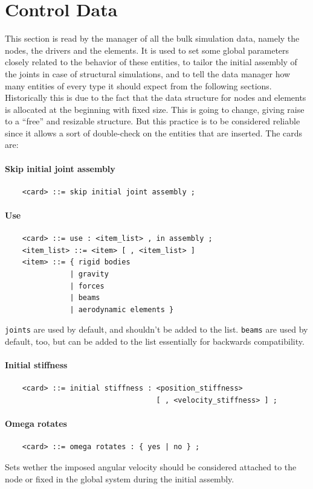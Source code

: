 \documentclass[10pt,dvips]{report}
\begin{document}
\chapter{Control Data}
This section is read by the manager of all the bulk simulation data, namely
the nodes, the drivers and the elements. It is used to set some global
parameters closely related to the behavior of these entities, to tailor the
initial assembly of the joints in case of structural simulations, and to
tell the data manager how many entities of every type it should expect from
the following sections. Historically this is due to the fact that the data
structure for nodes and elements is allocated at the beginning with fixed
size. This is going to change, giving raise to a ``free'' and resizable
structure. But this practice is to be considered reliable since it allows a
sort of double-check on the entities that are inserted.
The cards are: 

\subsubsection{Skip initial joint assembly}
\begin{verbatim}
    <card> ::= skip initial joint assembly ;
\end{verbatim}

\subsubsection{Use}
\begin{verbatim}
    <card> ::= use : <item_list> , in assembly ;
    <item_list> ::= <item> [ , <item_list> ]
    <item> ::= { rigid bodies 
               | gravity
               | forces
               | beams
               | aerodynamic elements } 
\end{verbatim}
{\tt joints} are used by default, and shouldn't be added to the list.
{\tt beams} are used by default, too, but can be added to the list
essentially for backwards compatibility.

\subsubsection{Initial stiffness}
\begin{verbatim}
    <card> ::= initial stiffness : <position_stiffness>
                                   [ , <velocity_stiffness> ] ;
\end{verbatim}

\subsubsection{Omega rotates}
\begin{verbatim}
    <card> ::= omega rotates : { yes | no } ;
\end{verbatim}
Sets wether the imposed angular velocity should be considered attached 
to the node or fixed in the global system during the initial assembly.
\end{document}
